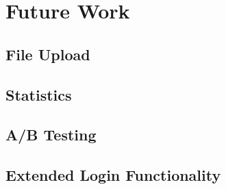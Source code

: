 \chapter{Future Work}

\section{File Upload}


\section{Statistics}


\section{A/B Testing}


\section{Extended Login Functionality}

